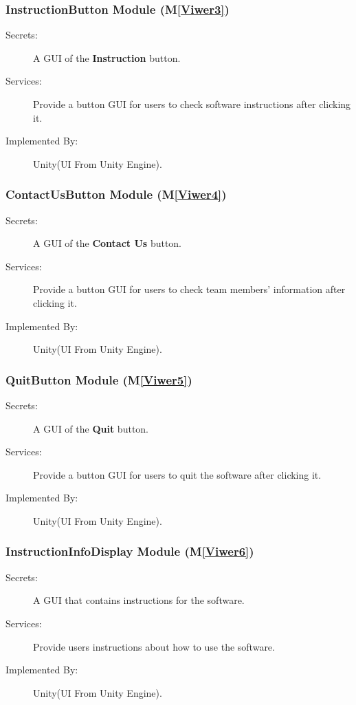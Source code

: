 \documentclass[12pt, titlepage]{article}
\newcommand{\mref}[1]{M\ref{#1}}
\begin{document}
\renewcommand\bt{\textbf{Instruction }}
\subsubsection{InstructionButton Module (\mref{Viwer3})}
\begin{description}
\item[Secrets:] A GUI of the \bt button.
\item[Services:] Provide a button GUI for users to check software instructions after 
clicking it.
\item[Implemented By:] Unity(UI From Unity Engine).
\end{description}

\renewcommand\bt{\textbf{Contact Us }}
\subsubsection{ContactUsButton Module (\mref{Viwer4})}
\begin{description}
\item[Secrets:] A GUI of the \bt button.
\item[Services:] Provide a button GUI for users to check team members' information after 
clicking it.
\item[Implemented By:] Unity(UI From Unity Engine).
\end{description}

\renewcommand\bt{\textbf{Quit }}
\subsubsection{QuitButton Module (\mref{Viwer5})}
\begin{description}
\item[Secrets:] A GUI of the \bt button.
\item[Services:] Provide a button GUI for users to quit the software after 
clicking it.
\item[Implemented By:] Unity(UI From Unity Engine).
\end{description}

\subsubsection{InstructionInfoDisplay Module (\mref{Viwer6})}
\begin{description}
\item[Secrets:] A GUI that contains instructions for the software.
\item[Services:] Provide users instructions about how to use the software.
\item[Implemented By:] Unity(UI From Unity Engine).
\end{description}
\end{document}
